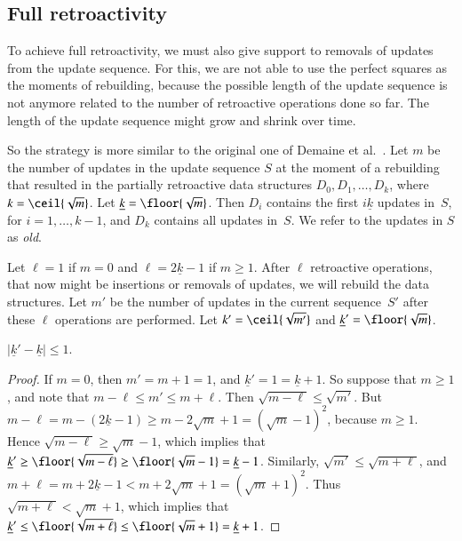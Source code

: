 \documentclass[3p,times,procedia]{elsarticle}
\begin{document}
\subsection{Full retroactivity}\label{subsec:fully}

To achieve full retroactivity, 
we must also give support to removals of updates from the update sequence.  
For this, we are not able to use the perfect squares as the moments 
of rebuilding, because the possible length of the update sequence is
not anymore related to the number of retroactive operations done so far. 
The length of the update sequence might grow and shrink over time. 

So the strategy is more similar to the original one of Demaine et al.~\cite{DemaineIL2007}. 
Let $m$ be the number of updates in the update sequence $S$ at the
moment of a rebuilding that resulted in the partially retroactive 
data structures $D_0,D_1,\ldots,D_k$, where $k=\ceil{\sqrt{m}}$.
Let $\underline{k} = \floor{\sqrt{m}}$.
Then $D_i$ contains the first $i\underline{k}$ updates in~$S$, 
for $i=1,\ldots,k-1$, and $D_k$ contains all updates in~$S$. 
We refer to the updates in $S$ as \emph{old}.

Let $\ell=1$ if $m = 0$ and $\ell=2\underline{k}-1$ if $m \geq 1$. 
After $\ell$ retroactive operations, that now might be insertions 
or removals of updates, we will rebuild the data structures.
Let $m'$ be the number of updates in the current sequence~$S'$ 
after these $\ell$ operations are performed. 
Let $k'= \ceil{\sqrt{m'}}$ and $\underline{k}' = \floor{\sqrt{m}}$. 

\begin{claim}
  $|\underline{k}' - \underline{k}| \leq 1$.
\end{claim}
\begin{proof}
  If $m = 0$, then $m' = m + 1 = 1$, and $\underline{k}' = 1 = \underline{k}+1$.
  So suppose that $m \geq 1$, and note that $m-\ell \leq m' \leq m+\ell$.  
  Then $\sqrt{m-\ell} \leq \sqrt{m'}$.  
  But $m-\ell = m - (2\underline{k}-1) \geq m - 2\sqrt{m} + 1 = (\sqrt{m}-1)^2$, 
  because $m \geq 1$. 
  Hence $\sqrt{m-\ell} \geq \sqrt{m}-1$, 
  which implies that 
  $\underline{k}' \geq \floor{\sqrt{m-\ell}} \geq \floor{\sqrt{m}-1} = \underline{k}-1$. 
  Similarly, $\sqrt{m'} \leq \sqrt{m+\ell}$, and
  $m+\ell = m + 2\underline{k}-1 < m + 2\sqrt{m} + 1 = (\sqrt{m}+1)^2$. 
  Thus $\sqrt{m+\ell} < \sqrt{m}+1$, 
  which implies that 
  $\underline{k}' \leq \floor{\sqrt{m+\ell}} \leq \floor{\sqrt{m}+1} = \underline{k}+1$. 
\end{proof}
\end{document}
